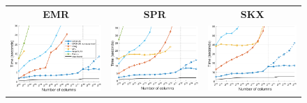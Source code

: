 \begin{figure}[htbp]
\newcommand{\figwidthLoc}{.31\linewidth}
\centering
\begin{tabular}{ccc}
\textbf{EMR} & \textbf{SPR} & \textbf{SKX} \\
\includegraphics[width=\figwidthLoc]{figs/emr_massiveER_varyScale_nnz2048.pdf} &
\includegraphics[width=\figwidthLoc]{figs/spr_massiveER_varyScale_nnz2048.pdf} &
\includegraphics[width=\figwidthLoc]{figs/skx_massiveER_varyScale_nnz2048.pdf}

\end{tabular}
\end{figure}
